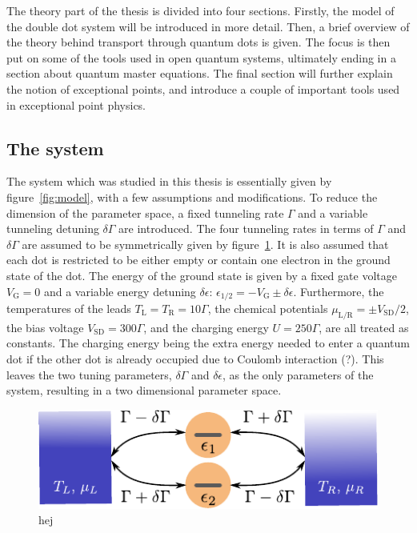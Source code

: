 \documentclass[../main.tex]{subfiles}
\begin{document}
The theory part of the thesis is divided into four sections. Firstly, the model of the double dot system will be introduced in more detail. Then, a brief overview of the theory behind transport through quantum dots is given. The focus is then put on some of the tools used in open quantum systems, ultimately ending in a section about quantum master equations. The final section will further explain the notion of exceptional points, and introduce a couple of important tools used in exceptional point physics.
\subsection{The system}\label{sec:sys}
The system which was studied in this thesis is essentially given by figure~\ref{fig:model}, with a few assumptions and modifications. To reduce the dimension of the parameter space, a fixed tunneling rate $\Gamma$ and a variable tunneling detuning $\delta\Gamma$ are introduced. The four tunneling rates in terms of $\Gamma$ and $\delta\Gamma$ are assumed to be symmetrically given by figure~\ref{fig:model2}. It is also assumed that each dot is restricted to be either empty or contain one electron in the ground state of the dot. The energy of the ground state is given by a fixed gate voltage $V_\text{G}=0$ and a variable energy detuning $\delta\epsilon$: $\epsilon_{1/2} = -V_\text{G} \pm \delta\epsilon$. Furthermore, the temperatures of the leads $T_\text{L}=T_\text{R}=10\Gamma$, the chemical potentials $\mu_\text{L/R} = \pm V_\text{SD}/2$, the bias voltage $V_\text{SD} = 300\Gamma$, and the charging energy $U = 250\Gamma$, are all treated as constants. The charging energy being the extra energy needed to enter a quantum dot if the other dot is already occupied due to Coulomb interaction (?). This leaves the two tuning parameters, $\delta\Gamma$ and $\delta\epsilon$, as the only parameters of the system, resulting in a two dimensional parameter space. 

\begin{figure}[H]
    \centering
    \includegraphics[width=0.8\linewidth]{figures/model.pdf}
    \caption{hej}
    \label{fig:model2}
\end{figure}
\end{document}

